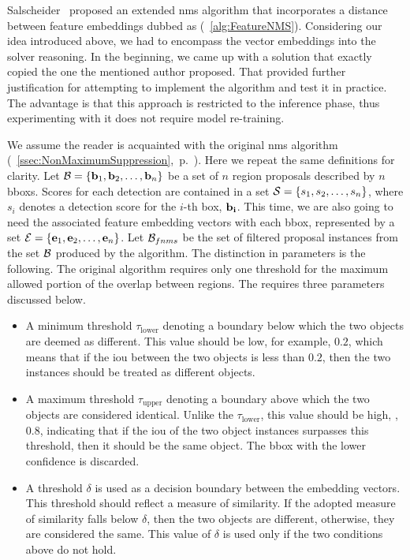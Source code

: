Salscheider~\cite{salscheider2020featurenms} proposed an extended \gls{nms} algorithm that incorporates a distance between feature embeddings dubbed as \featurenms{} (\algtext{}~\ref{alg:FeatureNMS}). Considering our idea introduced above, we had to encompass the vector embeddings into the solver reasoning. In the beginning, we came up with a solution that exactly copied the one the mentioned author proposed. That provided further justification for attempting to implement the algorithm and test it in practice. The advantage is that this approach is restricted to the inference phase, thus experimenting with it does not require model re-training.

\def\threshlower{\tau_{\text{lower}}}
\def\threshupper{\tau_{\text{upper}}}
\def\threshsim{\delta}

We assume the reader is acquainted with the original \gls{nms} algorithm (\sectiontext{}~\ref{ssec:NonMaximumSuppression},~p.~\pageref{ssec:NonMaximumSuppression}). Here we repeat the same definitions for clarity. Let $\mathcal{B} = \left\{ {\mathbf{b}_1, \mathbf{b}_2, \dots, \mathbf{b}_n} \right\}$ be a set of $n$ region proposals described by $n$ \glspl{bbox}. Scores for each detection are contained in a set $\mathcal{S} = \left\{ {s_1, s_2, \dots, s_n} \right\}$, where $s_i$ denotes a detection score for the $i$-th box, $\mathbf{b_i}$. This time, we are also going to need the associated feature embedding vectors with each \gls{bbox}, represented by a set $\mathcal{E} = \left\{ {\mathbf{e}_1, \mathbf{e}_2, \dots, \mathbf{e}_n} \right\}$. Let $\mathcal{B}_{fnms}$ be  the set of filtered proposal instances from the set $\mathcal{B}$ produced by the \featurenms{} algorithm. The distinction in parameters is the following. The original algorithm requires only one threshold for the maximum allowed portion of the overlap between regions. The \featurenms{} requires three parameters discussed below.
\begin{itemize}
    \item A minimum threshold $\threshlower$ denoting a boundary below which the two objects are deemed as different. This value should be low, for example, $0.2$, which means that if the \gls{iou} between the two objects is less than $0.2$, then the two instances should be treated as different objects.
    \item A maximum threshold $\threshupper$ denoting a boundary above which the two objects are considered identical. Unlike the $\threshlower$, this value should be high, \egtext{}, $0.8$, indicating that if the \gls{iou} of the two object instances surpasses this threshold, then it should be the same object. The \gls{bbox} with the lower confidence is discarded.
    \item A threshold $\threshsim$ is used as a decision boundary between the embedding vectors. This threshold should reflect a measure of similarity. If the adopted measure of similarity falls below $\threshsim$, then the two objects are different, otherwise, they are considered the same. This value of $\threshsim$ is used only if the two conditions above do not hold.
\end{itemize}

